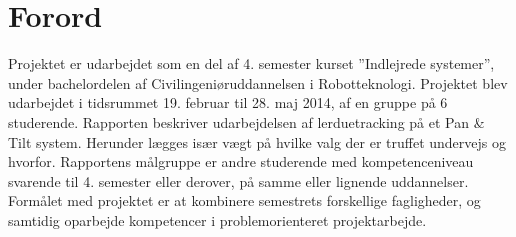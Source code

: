 \section*{Forord}
Projektet er udarbejdet som en del af 4. semester kurset ”Indlejrede systemer”, under bachelordelen af Civilingeniøruddannelsen i Robotteknologi. 
Projektet blev udarbejdet i tidsrummet 19. februar til 28. maj 2014, af en gruppe på 6 studerende.
Rapporten beskriver udarbejdelsen af lerduetracking på et Pan \& Tilt system. 
Herunder lægges især vægt på hvilke valg der er truffet undervejs og hvorfor. 
Rapportens målgruppe er andre studerende med kompetenceniveau svarende til 4. semester eller derover, på samme eller lignende uddannelser.
Formålet med projektet er at kombinere semestrets forskellige fagligheder, og samtidig oparbejde kompetencer i problemorienteret projektarbejde.



